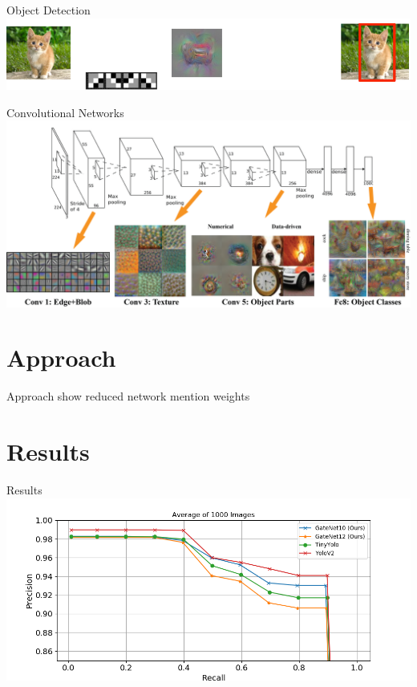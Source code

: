\documentclass{beamer}
\begin{document}
\begin{darkframes}
	\begin{frame}{Object Detection}
	\includegraphics[width=\textwidth]{fig/ObjectDetection}
	\end{frame}
	
		\begin{frame}{Convolutional Networks}
	\includegraphics[width=\textwidth]{fig/cnn}
\end{frame}

    
    \section{Approach}
  
    \begin{frame}{Approach}
  show reduced network mention weights
    \end{frame}
    
    \section{Results}
    \begin{frame}{Results}
    	\includegraphics[width=\textwidth]{fig/pr}
    \end{frame}


\end{darkframes}
\end{document}
